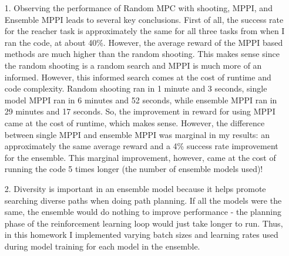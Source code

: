 \documentclass[12pt]{article}
\newcommand{\0}{\boldsymbol{0}}
\newcommand{\1}{\boldsymbol{1}}
\begin{document}
\begin{itemize}
    \item[1.] Observing the performance of Random MPC with shooting, MPPI, and Ensemble MPPI leads to several key conclusions. First of all, the success rate for the reacher task is approximately the same for all three tasks from when I ran the code, at about 40\%. However, the average reward of the MPPI based methods are much higher than the random shooting. This makes sense since the random shooting is a random search and MPPI is much more of an informed. However, this informed search comes at the cost of runtime and code complexity. Random shooting ran in 1 minute and 3 seconds, single model MPPI ran in 6 minutes and 52 seconds, while ensemble MPPI ran in 29 minutes and 17 seconds. So, the improvement in reward for using MPPI came at the cost of runtime, which makes sense. However, the difference between single MPPI and ensemble MPPI was marginal in my results: an approximately the same average reward and a 4\% success rate improvement for the ensemble. This marginal improvement, however, came at the cost of running the code 5 times longer (the number of ensemble models used)!
    \item[2.] Diversity is important in an ensemble model because it helps promote searching diverse paths when doing path planning. If all the models were the same, the ensemble would do nothing to improve performance - the planning phase of the reinforcement learning loop would just take longer to run. Thus, in this homework I implemented varying batch sizes and learning rates used during model training for each model in the ensemble.
\end{itemize}
\end{document}
